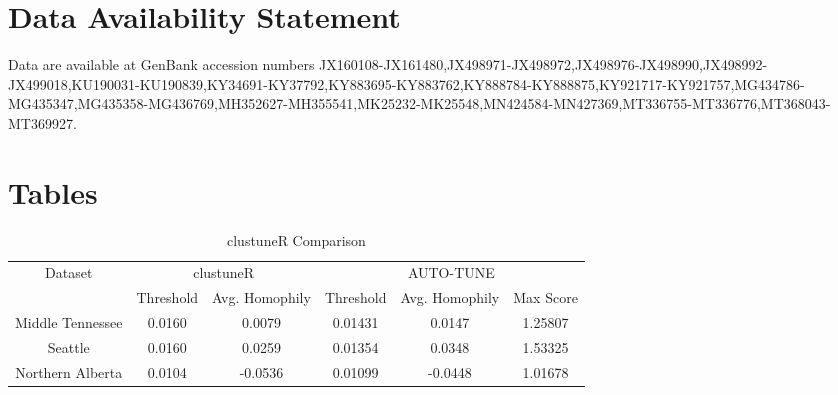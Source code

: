 \documentclass[utf8]{FrontiersinHarvard} %
\begin{document}
\section*{Data Availability Statement}

Data are available at GenBank accession numbers
JX160108-JX161480,JX498971-JX498972,JX498976-JX498990,JX498992-JX499018,KU190031-KU190839,KY34691-KY37792,KY883695-KY883762,KY888784-KY888875,KY921717-KY921757,MG434786-MG435347,MG435358-MG436769,MH352627-MH355541,MK25232-MK25548,MN424584-MN427369,MT336755-MT336776,MT368043-MT369927.


\nocite{*}



\section*{Tables}

\begin{table}[h]
\caption{clustuneR Comparison}
\vspace{8pt}
\centering
\label{tab:homophily}
\begin{tabular}{|c|c|c|c|c|c|}
\hline
    Dataset & \multicolumn{2}{c|}{clustuneR} & \multicolumn{3}{c|}{AUTO-TUNE} \\
    \cline{2-6}
     & Threshold & Avg. Homophily & Threshold & Avg. Homophily & Max Score \\
\hline
    Middle Tennessee &  0.0160 & 0.0079 &  0.01431 & 0.0147 & 1.25807 \\
    Seattle & 0.0160 & 0.0259 & 0.01354 & 0.0348 & 1.53325 \\
    Northern Alberta & 0.0104 & -0.0536 & 0.01099 & -0.0448 & 1.01678 \\
\hline
\end{tabular}
\end{table}
\end{document}
